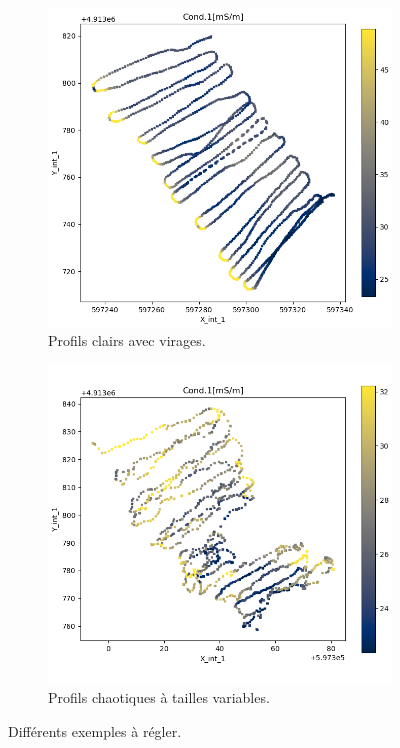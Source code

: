 \documentclass[12pt]{article}
\begin{document}
    \begin{figure}[ht!]
        \centering
        \begin{subfigure}[b]{0.475\textwidth}
            \centering
            \includegraphics[width=\textwidth]{Images/PseudoProf_1.png}
            \caption[]{{ \small Profils clairs avec virages.}}    
            \label{fig:2_pp_1}
        \end{subfigure}
        \hfill
        \begin{subfigure}[b]{0.475\textwidth}  
            \centering 
            \includegraphics[width=\textwidth]{Images/PseudoProf_2.png}
            \caption[]{{\small Profils chaotiques à tailles variables.}}    
        \end{subfigure}
        \caption{Différents exemples à régler.}
    \end{figure}
\end{document}
